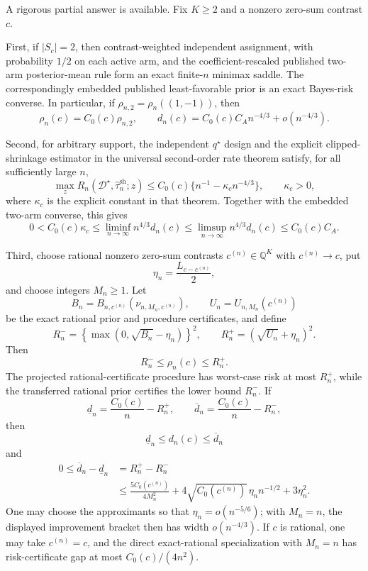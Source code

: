 A rigorous partial answer is available.  Fix \(K\geq2\) and a nonzero zero-sum contrast \(c\).

First, if \(|S_c|=2\), then contrast-weighted independent assignment, with probability \(1/2\) on each active arm, and the coefficient-rescaled published two-arm posterior-mean rule form an exact finite-\(n\) minimax saddle.  The correspondingly embedded published least-favorable prior is an exact Bayes-risk converse.  In particular, if \(\rho_{n,2}=\rho_n((1,-1))\), then
\[
 \rho_n(c)=C_0(c)\rho_{n,2},
 \qquad
 d_n(c)=C_0(c)C_A n^{-4/3}+o(n^{-4/3}).
\]

Second, for arbitrary support, the independent \(q^\star\) design and the explicit clipped-shrinkage estimator in the universal second-order rate theorem satisfy, for all sufficiently large \(n\),
\[
 \max_z R_n(\mathcal D^\star,\widehat\tau_n^{\mathrm{sh}};z)
 \leq C_0(c)\{n^{-1}-\kappa_c n^{-4/3}\},
 \qquad \kappa_c>0,
\]
where \(\kappa_c\) is the explicit constant in that theorem.  Together with the embedded two-arm converse, this gives
\[
 0<C_0(c)\kappa_c
 \leq\liminf_{n\to\infty}n^{4/3}d_n(c)
 \leq\limsup_{n\to\infty}n^{4/3}d_n(c)
 \leq C_0(c)C_A.
\]

Third, choose rational nonzero zero-sum contrasts \(c^{(n)}\in\mathbb Q^K\) with \(c^{(n)}\to c\), put
\[
 \eta_n=\frac{L_{c-c^{(n)}}}{2},
\]
and choose integers \(M_n\geq1\).  Let
\[
 B_n=B_{n,c^{(n)}}(\nu_{n,M_n,c^{(n)}}),
 \qquad
 U_n=U_{n,M_n}(c^{(n)})
\]
be the exact rational prior and procedure certificates, and define
\[
 R_n^-=\left\{\max(0,\sqrt{B_n}-\eta_n)\right\}^2,
 \qquad
 R_n^+=(\sqrt{U_n}+\eta_n)^2.
\]
Then
\[
 R_n^-\leq\rho_n(c)\leq R_n^+.
\]
The projected rational-certificate procedure has worst-case risk at most \(R_n^+\), while the transferred rational prior certifies the lower bound \(R_n^-\).  If
\[
 \underline d_n=\frac{C_0(c)}n-R_n^+,
 \qquad
 \overline d_n=\frac{C_0(c)}n-R_n^-,
\]
then
\[
 \underline d_n\leq d_n(c)\leq\overline d_n
\]
and
\[
 \begin{aligned}
 0\leq\overline d_n-\underline d_n
 &=R_n^+-R_n^-\\
 &\leq\frac{5C_0(c^{(n)})}{4M_n^2}
 +4\sqrt{C_0(c^{(n)})}\,\eta_n n^{-1/2}
 +3\eta_n^2.
 \end{aligned}
\]
One may choose the approximants so that \(\eta_n=o(n^{-5/6})\); with \(M_n=n\), the displayed improvement bracket then has width \(o(n^{-4/3})\).  If \(c\) is rational, one may take \(c^{(n)}=c\), and the direct exact-rational specialization with \(M_n=n\) has risk-certificate gap at most \(C_0(c)/(4n^2)\).

